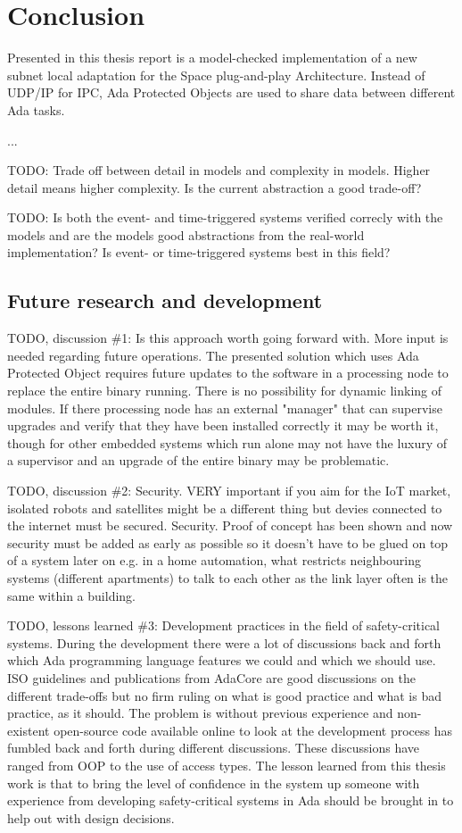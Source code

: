 \chapter{Conclusion}\label{ch:conclusion}
Presented in this thesis report is a model-checked implementation of a new
subnet local adaptation for the Space plug-and-play Architecture. Instead of
UDP/IP for IPC, Ada Protected Objects are used to share data between different
Ada tasks.

...


TODO: Trade off between detail in models and complexity in models. Higher
detail means higher complexity. Is the current abstraction a good trade-off?


TODO: Is both the event- and time-triggered systems verified correcly with the
models and are the models good abstractions from the real-world implementation?
Is event- or time-triggered systems best in this field?



\section{Future research and development}
TODO, discussion \#1: Is this approach worth going forward with. More input is
needed regarding future operations. The presented solution which uses Ada
Protected Object requires future updates to the software in a processing node
to replace the entire binary running. There is no possibility for dynamic
linking of modules.  If there processing node has an external "manager" that
can supervise upgrades and verify that they have been installed correctly it
may be worth it, though for other embedded systems which run alone may not have
the luxury of a supervisor and an upgrade of the entire binary may be
problematic.

TODO, discussion \#2: Security. VERY important if you aim for the IoT market,
isolated robots and satellites might be a different thing but devies connected
to the internet must be secured. Security. Proof of concept has been shown and
now security must be added as early as possible so it doesn't have to be glued
on top of a system later on e.g. in a home automation, what restricts
neighbouring systems (different apartments) to talk to each other as the link
layer often is the same within a building.

TODO, lessons learned \#3: Development practices in the field of
safety-critical systems. During the development there were a lot of discussions
back and forth which Ada programming language features we could and which we
should use. ISO guidelines and publications from AdaCore are good discussions
on the different trade-offs but no firm ruling on what is good practice and
what is bad practice, as it should. The problem is without previous experience
and non-existent open-source code available online to look at the development
process has fumbled back and forth during different discussions. These
discussions have ranged from OOP to the use of access types. The lesson learned
from this thesis work is that to bring the level of confidence in the system
up someone with experience from developing safety-critical systems in Ada
should be brought in to help out with design decisions.

